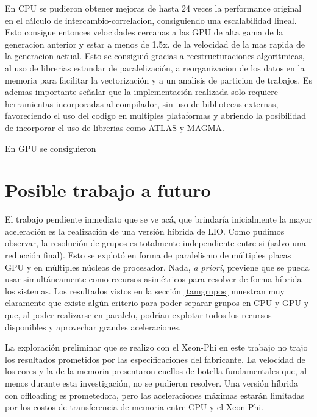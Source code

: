 En CPU se pudieron obtener mejoras de hasta 24 veces la performance original en el c\'alculo de intercambio-correlacion,
consiguiendo una escalabilidad lineal. Esto consigue entonces velocidades cercanas a las GPU de alta gama
de la generacion anterior y estar a menos de 1.5x. de la velocidad de la mas rapida de la generacion actual.
Esto se consigui\'o gracias a reestructuraciones algoritmicas, al uso de librerias estandar de paralelizaci\'on,
a reorganizacion de los datos en la memoria para facilitar la vectorizaci\'on y a un analisis de particion de trabajos.
Es ademas importante se\~nalar que la implementaci\'on realizada solo requiere herramientas incorporadas al compilador,
sin uso de bibliotecas externas, favoreciendo el uso del codigo en multiples plataformas y abriendo la posibilidad
de incorporar el uso de librerias como ATLAS y MAGMA.

En GPU se consiguieron


\section{Posible trabajo a futuro}
El trabajo pendiente inmediato que se ve ac\'a, que brindar\'ia inicialmente la mayor aceleraci\'on
es la realizaci\'on de una versi\'on h\'ibrida de LIO. Como pudimos observar, la resoluci\'on de grupos es
totalmente independiente entre si (salvo una reducci\'on final). Esto se explot\'o en forma de paralelismo
de m\'ultiples placas GPU y en m\'ultiples n\'ucleos de procesador. Nada, \textit{a priori}, previene
que se pueda usar simult\'aneamente como recursos asim\'etricos para resolver de forma h\'ibrida los sistemas.
Los resultados vistos en la secci\'on \ref{tamgrupos} muestran muy claramente que existe alg\'un criterio
para poder separar grupos en CPU y GPU y que, al poder realizarse en paralelo, podr\'ian explotar
todos los recursos disponibles y aprovechar grandes aceleraciones.

La exploraci\'on preliminar que se realizo con el Xeon-Phi en este trabajo no trajo los resultados
prometidos por las especificaciones del fabricante. La velocidad de los cores y la de la memoria
presentaron cuellos de botella fundamentales que, al menos durante esta investigaci\'on, no se
pudieron resolver. Una versi\'on h\'ibrida con offloading es prometedora, pero las aceleraciones m\'aximas
estar\'an limitadas por los costos de transferencia de memoria entre CPU y el Xeon Phi.

